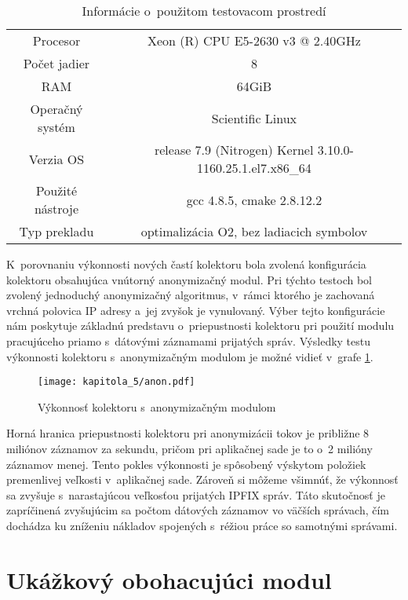 \begin{table}[ht]
    \centering
    \begin{tabular}{cc}
        \toprule
        Procesor & Xeon (R) CPU E5-2630 v3 @ 2.40GHz \\
        Počet jadier & 8 \\
        RAM & 64GiB \\
        Operačný systém & Scientific Linux \\
        Verzia OS & release 7.9 (Nitrogen) Kernel 3.10.0-1160.25.1.el7.x86\_64 \\
        Použité nástroje & gcc 4.8.5, cmake 2.8.12.2 \\
        Typ prekladu & optimalizácia O2, bez ladiacich symbolov \\
        \bottomrule
    \end{tabular}
    \caption{Informácie o~použitom testovacom prostredí}
    \label{tab:testovaci_stroj}
\end{table}

K~porovnaniu výkonnosti nových častí kolektoru bola zvolená konfigurácia kolektoru obsahujúca vnútorný anonymizačný modul. Pri týchto testoch bol zvolený jednoduchý anonymizačný algoritmus, v~rámci ktorého je zachovaná vrchná polovica IP adresy a~jej zvyšok je vynulovaný. Výber tejto konfigurácie nám
poskytuje základnú predstavu o~priepustnosti kolektoru pri použití modulu pracujúceho priamo s~dátovými záznamami prijatých správ. Výsledky testu výkonnosti kolektoru s~anonymizačným modulom je možné vidieť v~grafe \ref{fig:tests_anon}.

\begin{figure}[ht]
    \centering
    \texttt{[image: kapitola\_5/anon.pdf]}
    \caption{Výkonnosť kolektoru s~anonymizačným modulom}
    \label{fig:tests_anon}
\end{figure}

Horná hranica priepustnosti kolektoru pri anonymizácii tokov je približne 8 miliónov záznamov za sekundu, pričom pri aplikačnej sade je to o~2 milióny záznamov menej. Tento pokles výkonnosti je spôsobený výskytom položiek premenlivej veľkosti v~aplikačnej sade.
Zároveň si môžeme všimnúť, že výkonnosť sa zvyšuje s~narastajúcou veľkosťou prijatých IPFIX správ.
Táto skutočnosť je zapríčinená zvyšujúcim sa počtom dátových záznamov vo väčších správach, čím dochádza ku zníženiu nákladov spojených s~réžiou práce so samotnými správami.

\section{Ukážkový obohacujúci modul}

